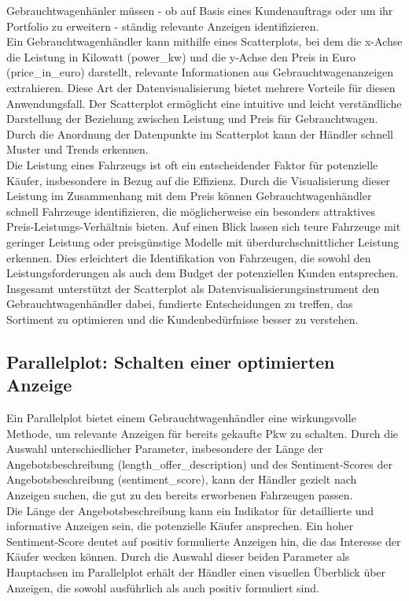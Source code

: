 Gebrauchtwagenhänler müssen - ob auf Basis eines Kundenauftrags oder um ihr Portfolio zu erweitern - ständig relevante Anzeigen identifizieren.\\
Ein Gebrauchtwagenhändler kann mithilfe eines Scatterplots, bei dem die x-Achse die Leistung in Kilowatt (power\_kw) und die y-Achse den Preis in Euro (price\_in\_euro) darstellt, relevante Informationen aus Gebrauchtwagenanzeigen extrahieren. Diese Art der Datenvisualisierung bietet mehrere Vorteile für diesen Anwendungsfall. Der Scatterplot ermöglicht eine intuitive und leicht verständliche Darstellung der Beziehung zwischen Leistung und Preis für Gebrauchtwagen. Durch die  Anordnung der Datenpunkte im Scatterplot kann der Händler schnell Muster und Trends erkennen. \\

Die Leistung eines Fahrzeugs ist oft ein entscheidender Faktor für potenzielle Käufer, insbesondere in Bezug auf die  Effizienz. Durch die Visualisierung dieser Leistung im Zusammenhang mit dem Preis können Gebrauchtwagenhändler schnell Fahrzeuge identifizieren, die möglicherweise ein besonders attraktives Preis-Leistungs-Verhältnis bieten. Auf einen Blick lassen sich teure Fahrzeuge mit geringer Leistung oder preisgünstige Modelle mit überdurchschnittlicher Leistung erkennen. Dies erleichtert die Identifikation von Fahrzeugen, die sowohl den Leistungsforderungen als auch dem Budget der potenziellen Kunden entsprechen. Insgesamt unterstützt der Scatterplot als Datenvisualisierungsinstrument den Gebrauchtwagenhändler dabei, fundierte Entscheidungen zu treffen, das Sortiment zu optimieren und die Kundenbedürfnisse besser zu verstehen. \\

\subsection{Parallelplot: Schalten einer optimierten Anzeige}

Ein Parallelplot bietet einem Gebrauchtwagenhändler eine wirkungsvolle Methode, um relevante Anzeigen für bereits gekaufte Pkw zu schalten. Durch die Auswahl unterschiedlicher Parameter, insbesondere der Länge der Angebotsbeschreibung (length\_offer\_description) und des Sentiment-Scores der Angebotsbeschreibung (sentiment\_score), kann der Händler gezielt nach Anzeigen suchen, die gut zu den bereits erworbenen Fahrzeugen passen. \\

Die Länge der Angebotsbeschreibung kann ein Indikator für detaillierte und informative Anzeigen sein, die potenzielle Käufer ansprechen. Ein hoher Sentiment-Score deutet auf positiv formulierte Anzeigen hin, die das Interesse der Käufer wecken können. Durch die Auswahl dieser beiden Parameter als Hauptachsen im Parallelplot erhält der Händler einen visuellen Überblick über Anzeigen, die sowohl ausführlich als auch positiv formuliert sind. \\

